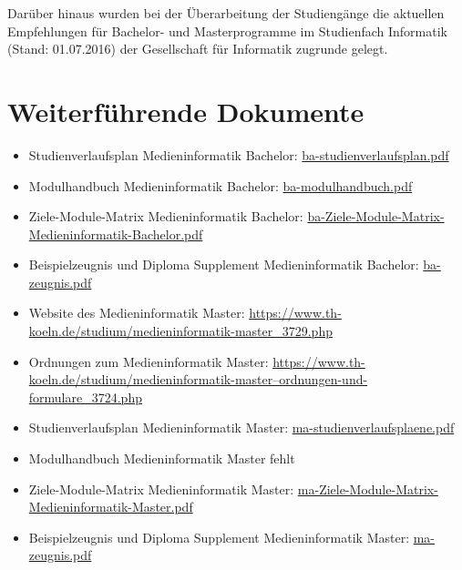 Darüber hinaus wurden bei der Überarbeitung der Studiengänge die
aktuellen Empfehlungen für Bachelor- und Masterprogramme im Studienfach
Informatik (Stand: 01.07.2016) der Gesellschaft für Informatik zugrunde
gelegt.

\section{Weiterführende
Dokumente}\label{weiterfuxfchrende-dokumente-2}

\begin{itemize}
\tightlist
\item
  Studienverlaufsplan Medieninformatik Bachelor:
  \href{https://th-koeln.github.io/mi-2017/anhaenge/ba-studienverlaufsplan.pdf}{ba-studienverlaufsplan.pdf}
\item
  Modulhandbuch Medieninformatik Bachelor:
  \href{https://th-koeln.github.io/mi-2017/anhaenge/ba-modulhandbuch.pdf}{ba-modulhandbuch.pdf}
\item
  Ziele-Module-Matrix Medieninformatik Bachelor:
  \href{https://th-koeln.github.io/mi-2017/anhaenge/ba-Ziele-Module-Matrix-Medieninformatik-Bachelor.pdf}{ba-Ziele-Module-Matrix-Medieninformatik-Bachelor.pdf}
\item
  Beispielzeugnis und Diploma Supplement Medieninformatik Bachelor:
  \href{https://th-koeln.github.io/mi-2017/anhaenge/ba-zeugnis.pdf}{ba-zeugnis.pdf}
\item
  Website des Medieninformatik Master:
  \url{https://www.th-koeln.de/studium/medieninformatik-master\_3729.php}
\item
  Ordnungen zum Medieninformatik Master:
  \href{https://www.th-koeln.de/studium/medieninformatik-master--ordnungen-und-formulare_3724.php}{https://www.th-koeln.de/studium/medieninformatik-master--ordnungen-und-formulare\_3724.php}
\item
  Studienverlaufsplan Medieninformatik Master:
  \href{https://th-koeln.github.io/mi-2017/anhaenge/ma-studienverlaufsplaene.pdf}{ma-studienverlaufsplaene.pdf}
\item
  Modulhandbuch Medieninformatik Master fehlt
\item
  Ziele-Module-Matrix Medieninformatik Master:
  \href{https://th-koeln.github.io/mi-2017/anhaenge/ma-Ziele-Module-Matrix-Medieninformatik-Master.pdf}{ma-Ziele-Module-Matrix-Medieninformatik-Master.pdf}
\item
  Beispielzeugnis und Diploma Supplement Medieninformatik Master:
  \href{https://th-koeln.github.io/mi-2017/anhaenge/ma-zeugnis.pdf}{ma-zeugnis.pdf}
\end{itemize}

